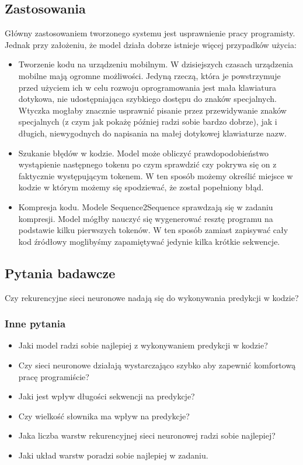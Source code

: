 \subsection {Zastosowania}
Główny zastosowaniem tworzonego systemu jest usprawnienie pracy programisty. Jednak przy założeniu, że model działa dobrze 
istnieje więcej przypadków użycia: 
\begin{itemize}
	\item Tworzenie kodu na urządzeniu mobilnym. W dzisiejszych czasach urządzenia mobilne mają ogromne możliwości. 
	Jedyną rzeczą, która je powstrzymuje przed użyciem ich w celu rozwoju oprogramowania jest mała klawiatura dotykowa, nie
	udostępniająca szybkiego dostępu do znaków specjalnych. Wtyczka mogłaby znacznie usprawnić pisanie przez przewidywanie znaków 
	specjalnych (z czym jak pokażę później radzi sobie bardzo dobrze), jak i długich, niewygodnych do napisania na małej dotykowej klawiaturze nazw.

	\item Szukanie błędów w kodzie. Model może obliczyć prawdopodobieństwo wystąpienie następnego tokenu po czym sprawdzić czy 
	pokrywa się on z faktycznie występującym tokenem. W ten sposób możemy określić miejsce w kodzie w którym możemy się 
	spodziewać, że został popełniony błąd. 

	\item Kompresja kodu. Modele Sequence2Sequence sprawdzają się w zadaniu kompresji. Model mógłby nauczyć się wygenerować resztę programu 
	na podstawie kilku pierwszych tokenów. W ten sposób zamiast zapisywać cały kod źródłowy moglibyśmy zapamiętywać jedynie kilka 
	krótkie sekwencje. 
\end{itemize}

\subsection {Pytania badawcze}
Czy rekurencyjne sieci neuronowe nadają się do wykonywania predykcji w kodzie?
\subsubsection {Inne pytania}
\begin{itemize}
	\item Jaki model radzi sobie najlepiej z wykonywaniem predykcji w kodzie? 
	\item Czy sieci neuronowe działają wystarczająco szybko aby zapewnić komfortową pracę programiście? 
	\item Jaki jest wpływ długości sekwencji na predykcje? 
	\item Czy wielkość słownika ma wpływ na predykcje? 
	\item Jaka liczba warstw rekurencyjnej sieci neuronowej radzi sobie najlepiej? 
	\item Jaki układ warstw poradzi sobie najlepiej w zadaniu. 
\end{itemize} 


